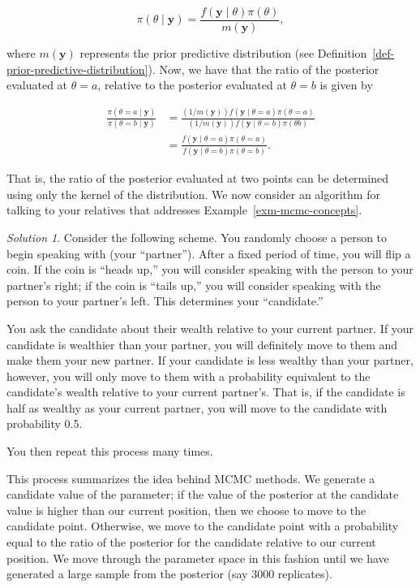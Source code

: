 \documentclass[
  letterpaper,
  DIV=11,
  numbers=noendperiod]{scrreprt}
\theoremstyle{definition}
\theoremstyle{plain}
\theoremstyle{definition}
\theoremstyle{remark}
\newtheorem*{solution}{Solution}
\begin{document}
\[\pi(\theta \mid \mathbf{y}) = \frac{f(\mathbf{y} \mid \theta) \pi(\theta)}{m(\mathbf{y})},\]

where \(m(\mathbf{y})\) represents the prior predictive distribution
(see Definition~\ref{def-prior-predictive-distribution}). Now, we have
that the ratio of the posterior evaluated at \(\theta = a\), relative to
the posterior evaluated at \(\theta = b\) is given by

\[
\begin{aligned}
  \frac{\pi(\theta = a \mid \mathbf{y})}{\pi(\theta = b \mid \mathbf{y})} 
    &= \frac{(1/m(\mathbf{y})) f(\mathbf{y} \mid \theta = a) \pi(\theta = a)}{(1/m(\mathbf{y})) f(\mathbf{y} \mid \theta = b)\pi(\theta b)} \\
    &= \frac{f(\mathbf{y} \mid \theta = a) \pi(\theta = a)}{f(\mathbf{y} \mid \theta = b)\pi(\theta = b)}.
\end{aligned}
\]

That is, the ratio of the posterior evaluated at two points can be
determined using only the kernel of the distribution. We now consider an
algorithm for talking to your relatives that addresses
Example~\ref{exm-mcmc-concepts}.

\begin{solution}

Consider the following scheme. You randomly choose a person to begin
speaking with (your ``partner''). After a fixed period of time, you will
flip a coin. If the coin is ``heads up,'' you will consider speaking
with the person to your partner's right; if the coin is ``tails up,''
you will consider speaking with the person to your partner's left. This
determines your ``candidate.''

You ask the candidate about their wealth relative to your current
partner. If your candidate is wealthier than your partner, you will
definitely move to them and make them your new partner. If your
candidate is less wealthy than your partner, however, you will only move
to them with a probability equivalent to the candidate's wealth relative
to your current partner's. That is, if the candidate is half as wealthy
as your current partner, you will move to the candidate with probability
0.5.

You then repeat this process many times.

\end{solution}

This process summarizes the idea behind MCMC methods. We generate a
candidate value of the parameter; if the value of the posterior at the
candidate value is higher than our current position, then we choose to
move to the candidate point. Otherwise, we move to the candidate point
with a probability equal to the ratio of the posterior for the candidate
relative to our current position. We move through the parameter space in
this fashion until we have generated a large sample from the posterior
(say 3000 replicates).
\end{document}

